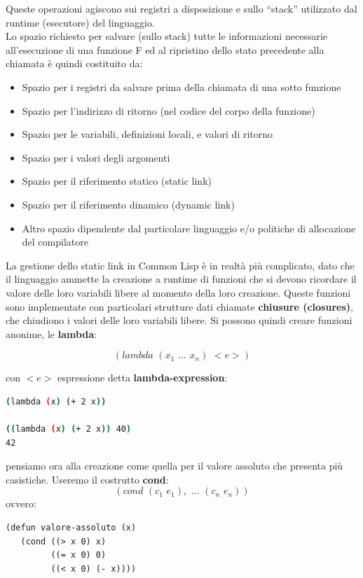 \documentclass[a4paper,12pt, oneside]{book}
\begin{document}
Queste operazioni agiscono sui registri a disposizione e sullo “stack” utilizzato dal runtime (esecutore) del linguaggio.\\Lo spazio richiesto per salvare (sullo stack) tutte le informazioni necessarie all’esecuzione di
una funzione F ed al ripristino dello stato precedente alla chiamata è quindi costituito da:
\begin{itemize}
\item Spazio per i registri da salvare prima della chiamata di una sotto funzione
\item Spazio per l’indirizzo di ritorno (nel codice del corpo della funzione)
\item Spazio per le variabili, definizioni locali, e valori di ritorno
\item Spazio per i valori degli argomenti
\item Spazio per il riferimento statico (static link)
\item Spazio per il riferimento dinamico (dynamic link)
\item Altro spazio dipendente dal particolare linguaggio e/o politiche di allocazione del compilatore
\end{itemize}
La gestione dello static link in Common Lisp è in realtà più complicato,
dato che il linguaggio ammette la creazione a runtime di funzioni che si
devono ricordare il valore delle loro variabili libere al momento della
loro creazione. Queste funzioni sono implementate con particolari strutture dati chiamate \textbf{chiusure (closures)}, che chiudiono i valori delle loro variabili libere. Si possono quindi creare funzioni anonime, le \textbf{lambda}:
\begin{center}
$$(lambda\,\,(x_1\,\,...\,\,x_n)\,\,<e>)$$
\end{center}
con $<e>$ espressione detta \textbf{lambda-expression}:
\begin{shaded}
\begin{lstlisting}[language=bash]
(lambda (x) (+ 2 x))

((lambda (x) (+ 2 x)) 40)
42
\end{lstlisting}
\end{shaded}
pensiamo ora alla creazione come quella per il valore assoluto che presenta più casistiche. Useremo il costrutto \textbf{cond}:
$$(cond\,\,(c_1\,\,e_1),\,\,...\,\,(c_n\,\,e_n))$$
ovvero:
\begin{verbatim}
(defun valore-assoluto (x)
   (cond ((> x 0) x)
         ((= x 0) 0)
         ((< x 0) (- x))))
\end{verbatim}
\end{document}
